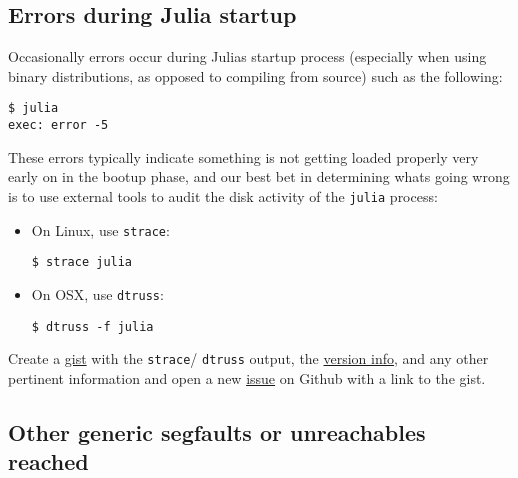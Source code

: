 \hypertarget{8599391806074935874}{}


\subsection{Errors during Julia startup}



Occasionally errors occur during Julia{\textquotesingle}s startup process (especially when using binary distributions, as opposed to compiling from source) such as the following:




\begin{verbatim}
$ julia
exec: error -5
\end{verbatim}



These errors typically indicate something is not getting loaded properly very early on in the bootup phase, and our best bet in determining what{\textquotesingle}s going wrong is to use external tools to audit the disk activity of the \texttt{julia} process:



\begin{itemize}
\item On Linux, use \texttt{strace}:


\begin{lstlisting}
$ strace julia
\end{lstlisting}


\item On OSX, use \texttt{dtruss}:


\begin{lstlisting}
$ dtruss -f julia
\end{lstlisting}

\end{itemize}


Create a \href{https://gist.github.com}{gist} with the \texttt{strace}/ \texttt{dtruss} output, the \hyperlink{4601189142062189569}{version info}, and any other pertinent information and open a new \href{https://github.com/JuliaLang/julia/issues?q=is\%3Aopen}{issue} on Github with a link to the gist.



\hypertarget{15486738137712275027}{}


\subsection{Other generic segfaults or unreachables reached}



